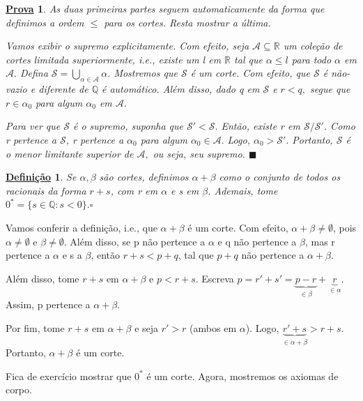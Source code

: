 \documentclass{article}
\newtheorem*{def*}{\underline{Defini\c c\~ao}}
\newtheorem*{proof*}{\underline{Prova}}
\renewcommand\qedsymbol{$\blacksquare$}
\begin{document}
 \begin{proof*}
   As duas primeiras partes seguem automaticamente da forma que definimos a ordem $\leq{}$ para os cortes. Resta mostrar a \'ultima.

   Vamos exibir o supremo explicitamente. Com efeito, seja $\mathcal{A}\subseteq{\mathbb{R}}$ um cole\c c\~ao de cortes
 limitada superiormente, i.e., existe um l em $\mathbb{R}$ tal que $\alpha \leq{l}$ para todo $\alpha$ em $\mathcal{A}.$
 Defina $\mathcal{S} = \bigcup_{\alpha\in \mathcal{A}}\alpha$. Mostremos que $\mathcal{S}$ \'e um corte. Com efeito,
 que $\mathcal{S}$ \'e n\~ao-vazio e diferente de $\mathbb{Q}$ \'e autom\'atico. Al\'em disso, dado q em $\mathcal{S}$ e $r < q,$
segue que $r\in \alpha_{0}$ para algum $\alpha_{0}$ em $\mathcal{A}.$

  Para ver que $\mathcal{S}$ \'e o supremo, suponha que $\mathcal{S}' < \mathcal{S}.$ Ent\~ao, existe r em $\mathcal{S}/\mathcal{S}'$.
Como r pertence a $\mathcal{S}$, r pertence a $\alpha_{0}$ para algum $\alpha_{0}\in \mathcal{A}.$ Logo, $\alpha_{0} > \mathcal{S}'.$ Portanto,
 $\mathcal{S}$ \'e o menor limitante superior de $\mathcal{A},$ ou seja, seu supremo. \qedsymbol
 \end{proof*}
 \begin{def*}
   Se $\alpha, \beta$ s\~ao cortes, definimos $\alpha + \beta$ como o conjunto de todos os racionais da forma $r + s$, com r em $\alpha$
 e s em $\beta$. Ademais, tome $0^* = \{s\in \mathbb{Q}: s < 0\}.\square$
 \end{def*}
  Vamos conferir a defini\c c\~ao, i.e., que $\alpha + \beta$ \'e um corte. Com efeito, $\alpha + \beta\neq\emptyset$, pois $\alpha\neq\emptyset$
e $\beta\neq\emptyset$. Al\'em disso, se p n\~ao pertence a $\alpha$ e q n\~ao pertence a $\beta$, mas r pertence a $\alpha$ e s a $\beta$,
ent\~ao $r + s < p + q$, tal que $p + q$ n\~ao pertence a $\alpha + \beta.$

  Al\'em disso, tome $r + s$ em $\alpha + \beta$ e $p < r + s$. Escreva $p = r' + s' = \underbrace{p - r}_{\in \beta} + \underbrace{r}_{\in \alpha}.$ Assim,
p pertence a $\alpha + \beta.$

  Por fim, tome $r + s$ em $\alpha + \beta$ e seja $r' > r$ (ambos em $\alpha$). Logo, $\underbrace{r' + s}_{\in \alpha + \beta} > r + s$. Portanto, 
$\alpha + \beta$ \'e um corte. 

  Fica de exerc\'icio mostrar que $0^*$ \'e um corte. Agora, mostremos os axiomas de corpo.
\end{document}
